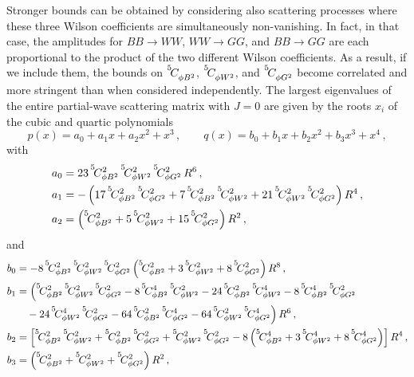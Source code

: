 Stronger bounds can be obtained by considering also scattering processes where these three Wilson coefficients are simultaneously non-vanishing.
In fact, in that case, the amplitudes for $BB \to WW$, $WW \to GG$, and $BB \to GG$ are each proportional to the product of the two different Wilson coefficients.
As a result, if we include them, the bounds on $\coef{5}{\phi B^2}{}$, $\coef{5}{\phi W^2}{}$, and $\coef{5}{\phi G^2}{}$ become correlated and more stringent than when considered independently.
The largest eigenvalues of the entire partial-wave scattering matrix with $J=0$ are given by the roots $x_i$ of the cubic and quartic polynomials
\begin{equation}
    p(x) = a_0 + a_1 x+a_2x^2+x^3\,, \qquad
    q(x) = b_0 + b_1 x + b_2 x^2 + b_3 x^3 + x^4\,,
\end{equation}
with
\begin{align}
    a_0 &= 23\, \coef{5}{\phi B^2}{2}\,\coef{5}{\phi W^2}{2}\,\coef{5}{\phi G^2}{2}\,R^6 \,,\\
    a_1&= - \left(17\, \coef{5}{\phi B^2}{2}\,\coef{5}{\phi G^2}{2}+7\,\coef{5}{\phi B^2}{2}\,\coef{5}{\phi W^2}{2}+21\,\coef{5}{\phi W^2}{2}\,\coef{5}{\phi G^2}{2}\right)R^4\,,\\
    a_2&= \left(\coef{5}{\phi B^2}{2} + 5\,\coef{5}{\phi W^2}{2} + 15\,\coef{5}{\phi G^2}{2}\right) R^2\,,
\end{align}
and
\begin{align}
    b_0 &= -8\, \coef{5}{\phi B^2}{2}\,\coef{5}{\phi W^2}{2}\,\coef{5}{\phi G^2}{2} \left(\coef{5}{\phi B^2}{2}+3\,\coef{5}{\phi W^2}{2}+8\,\coef{5}{\phi G^2}{2}\right) R^8\,,
    \\
    b_1 &= 
    \Big(\coef{5}{\phi B^2}{2}\,\coef{5}{\phi W^2}{2}\,\coef{5}{\phi G^2}{2} -8\,\coef{5}{\phi B^2}{4}\,\coef{5}{\phi W^2}{2}
    -24\,\coef{5}{\phi B^2}{2}\,\coef{5}{\phi W^2}{4}
    -8\,\coef{5}{\phi B^2}{4}\,\coef{5}{\phi G^2}{2}
    \nonumber \\&\quad -24\,\coef{5}{\phi W^2}{4}\,\coef{5}{\phi G^2}{2}
    -64\, \coef{5}{\phi B^2}{2}\,\coef{5}{\phi G^2}{4}
    -64\,\coef{5}{\phi W^2}{2}\,\coef{5}{\phi G^2}{4}\Big) \, R^6\,,
    \\
    b_2 &= 
    \left[
    \coef{5}{\phi B^2}{2}\,\coef{5}{\phi W^2}{2}
    +\coef{5}{\phi B^2}{2}\,\coef{5}{\phi G^2}{2}
    +\coef{5}{\phi W^2}{2}\,\coef{5}{\phi G^2}{2} -8\left( \coef{5}{\phi B^2}{4}+3\,\coef{5}{\phi W^2}{4}+8\,\coef{5}{\phi G^2}{4} \right)\right]R^4\,,
    \\
    b_3 &= \left(\coef{5}{\phi B^2}{2} + \coef{5}{\phi W^2}{2} + \coef{5}{\phi G^2}{2}\right)R^2\,,
\end{align}
